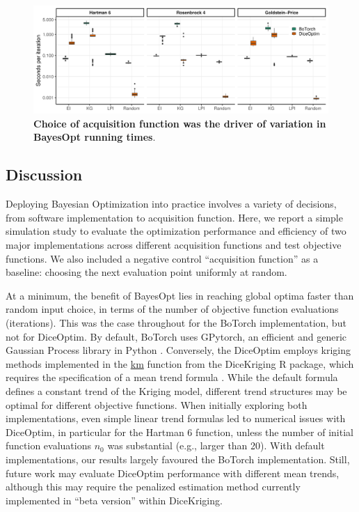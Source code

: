 \begin{figure}[H]
\includegraphics[width=0.99\linewidth]{output/runtime_results.png}
\caption{\small \textbf{Choice of acquisition function was the driver of variation in BayesOpt running times}.}
\label{fig:runtime}
\end{figure}

\subsection{Discussion}

Deploying Bayesian Optimization into practice involves a variety of decisions, from software implementation to acquisition function. Here, we report a simple simulation study to evaluate the optimization performance and efficiency of two major implementations across different acquisition functions and test objective functions. We also included a negative control ``acquisition function'' as a baseline: choosing the next evaluation point uniformly at random.

At a minimum, the benefit of BayesOpt lies in reaching global optima faster than random input choice, in terms of the number of objective function evaluations (iterations). This was the case throughout for the BoTorch implementation, but not for DiceOptim. By default, BoTorch uses GPytorch, an efficient and generic Gaussian Process library in Python \cite{Gardner2018}. Conversely, the DiceOptim employs kriging methods implemented in the \href{https://rdrr.io/cran/DiceKriging/man/km.html}{km} function from the DiceKriging R package, which requires the specification of a mean trend formula \cite{Roustant2012}. While the default formula defines a constant trend of the Kriging model, different trend structures may be optimal for different objective functions. When initially exploring both implementations, even simple linear trend formulas led to numerical issues with DiceOptim, in particular for the Hartman 6 function, unless the number of initial function evaluations $n_0$ was substantial (e.g., larger than 20). With default implementations, our results largely favoured the BoTorch implementation. Still, future work may evaluate DiceOptim performance with different mean trends, although this may require the penalized estimation method currently implemented in ``beta version'' within DiceKriging.

